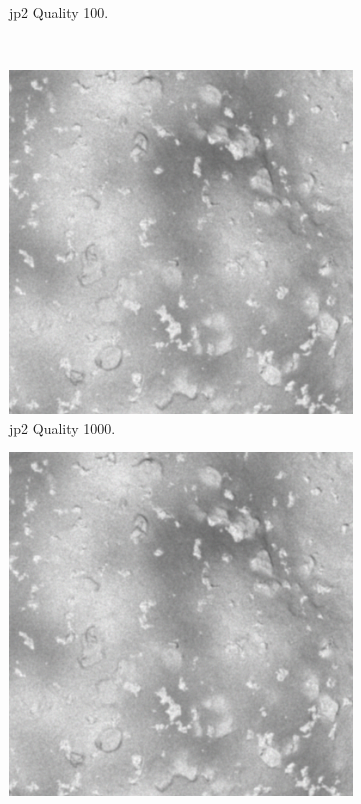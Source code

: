 \begin{figure}[htb]
\begin{subfigure}[b]{0.47\textwidth}
            \caption{\gls{jp2} Quality 100.}
            \label{fig:img_quality_100}
        \end{subfigure}
        \\
        \begin{subfigure}[b]{0.47\textwidth}
            \centering
            \includegraphics[width=\textwidth]{doc/thesis/0_figures/compare_quality/set1/center/jp2_1000_center.png}
            \caption{\gls{jp2} Quality 1000.}
            \label{fig:img_quality_1000}
        \end{subfigure}
        \begin{subfigure}[b]{0.47\textwidth}
            \centering
            \includegraphics[width=\textwidth]{doc/thesis/0_figures/compare_quality/set1/center/png_center.png}

\end{subfigure}
\end{figure}
